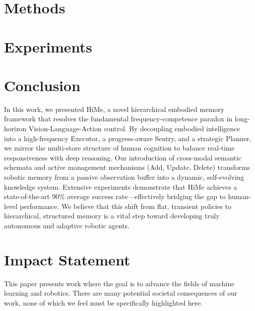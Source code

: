 \documentclass{article}
\theoremstyle{plain}
\theoremstyle{definition}
\theoremstyle{remark}
\begin{document}

\section{Methods}


\section{Experiments}



\section{Conclusion}


In this work, we presented HiMe, a novel hierarchical embodied memory framework that resolves the fundamental frequency-competence paradox in long-horizon Vision-Language-Action control. By decoupling embodied intelligence into a high-frequency Executor, a progress-aware Sentry, and a strategic Planner, we mirror the multi-store structure of human cognition to balance real-time responsiveness with deep reasoning. Our introduction of cross-modal semantic schemata and active management mechanisms (Add, Update, Delete) transforms robotic memory from a passive observation buffer into a dynamic, self-evolving knowledge system. Extensive experiments demonstrate that HiMe achieves a state-of-the-art 90\% average success rate—effectively bridging the gap to human-level performance. 
We believe that this shift from flat, transient policies to hierarchical, structured memory is a vital step toward developing truly autonomous and adaptive robotic agents.


\section*{Impact Statement}

This paper presents work where the goal is to advance the fields of machine learning and robotics. There are many potential societal consequences of our work, none of which we feel must be specifically highlighted here.
\end{document}
